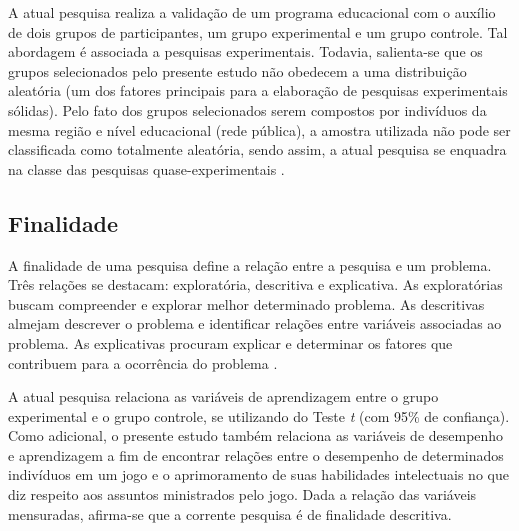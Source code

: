 A atual pesquisa realiza a validação de um programa educacional com o auxílio de dois grupos de participantes, um grupo experimental e um grupo controle. Tal abordagem é associada a pesquisas experimentais. Todavia, salienta-se que os grupos selecionados pelo presente estudo não obedecem a uma distribuição aleatória (um dos fatores principais para a elaboração de pesquisas experimentais sólidas). %
Pelo fato dos grupos selecionados serem compostos por indivíduos da mesma região e nível educacional (rede pública), a amostra utilizada não pode ser classificada como totalmente aleatória, sendo assim, a atual pesquisa se enquadra na classe das pesquisas quase-experimentais .


\subsection{Finalidade}\label{sub:Finalidade}

A  finalidade de uma pesquisa define a relação entre a pesquisa e um problema. Três relações se destacam: exploratória, descritiva e explicativa. As exploratórias buscam compreender e explorar melhor determinado problema. As descritivas almejam descrever o problema e identificar relações entre variáveis associadas ao problema. As explicativas procuram explicar e determinar os fatores que contribuem para a ocorrência do problema \cite{trivinos2009introduccao}. 

A atual pesquisa relaciona as variáveis de aprendizagem entre o grupo experimental e o grupo controle, se utilizando do Teste \textit{t} (com 95\% de confiança). Como adicional, o presente estudo também relaciona as variáveis de desempenho e aprendizagem a fim de encontrar relações entre o desempenho de determinados indivíduos em um jogo e o aprimoramento de suas habilidades intelectuais no que diz respeito aos assuntos ministrados pelo jogo. Dada a relação das variáveis mensuradas, afirma-se que a corrente pesquisa é de finalidade descritiva.

